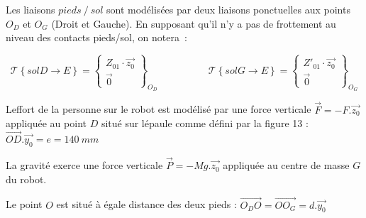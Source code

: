 Les liaisons \(pieds\ /\ sol\) sont modélisées par deux liaisons ponctuelles aux points \(O_{D}\) et \(O_{G}\) (Droit et Gauche). En supposant qu'il n'y a pas de frottement au niveau des contacts pieds/sol, on notera~:

\[\mathcal{T}\left\{ solD \rightarrow E \right\} = \begin{Bmatrix}
Z_{01} \cdot \overrightarrow{z_{0}} \\
\overrightarrow{0}
\end{Bmatrix}_{O_{D}}\ \ \ \ \ \ \ \ \ \ \ \mathcal{\ \ \ \ \ \ \ \ \ \ \ \ T}\left\{ solG \rightarrow E \right\} = \begin{Bmatrix}
{Z'}_{01} \cdot \overrightarrow{z_{0}} \\
\overrightarrow{0}
\end{Bmatrix}_{O_{G}}\]

L\textquotesingle effort de la personne sur le robot est modélisé par une force verticale \(\overrightarrow{F} = - F.\overrightarrow{z_{0}}\) appliquée au point \(D\) situé sur l\textquotesingle épaule comme défini par la figure 13 : \(\overrightarrow{OD}.\overrightarrow{y_{0}} = e = 140\ mm\)

La gravité exerce une force verticale \(\overrightarrow{P} = - Mg.\overrightarrow{z_{0}}\) appliquée au centre de masse \(G\) du robot.

Le point \(O\) est situé à égale distance des deux pieds : \(\overrightarrow{O_{D}O} = \overrightarrow{{OO}_{G}} = d.\overrightarrow{y_{0}}\)

